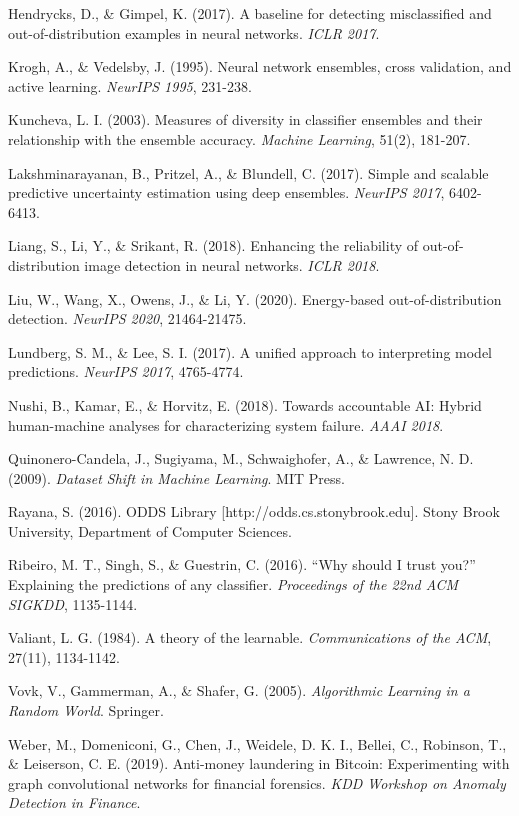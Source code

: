 \documentclass[
  11pt,
]{article}
\newcounter{none} %
\begin{document}
Hendrycks, D., \& Gimpel, K. (2017). A baseline for detecting
misclassified and out-of-distribution examples in neural networks.
\emph{ICLR 2017}.

Krogh, A., \& Vedelsby, J. (1995). Neural network ensembles, cross
validation, and active learning. \emph{NeurIPS 1995}, 231-238.

Kuncheva, L. I. (2003). Measures of diversity in classifier ensembles
and their relationship with the ensemble accuracy. \emph{Machine
Learning}, 51(2), 181-207.

Lakshminarayanan, B., Pritzel, A., \& Blundell, C. (2017). Simple and
scalable predictive uncertainty estimation using deep ensembles.
\emph{NeurIPS 2017}, 6402-6413.

Liang, S., Li, Y., \& Srikant, R. (2018). Enhancing the reliability of
out-of-distribution image detection in neural networks. \emph{ICLR
2018}.

Liu, W., Wang, X., Owens, J., \& Li, Y. (2020). Energy-based
out-of-distribution detection. \emph{NeurIPS 2020}, 21464-21475.

Lundberg, S. M., \& Lee, S. I. (2017). A unified approach to
interpreting model predictions. \emph{NeurIPS 2017}, 4765-4774.

Nushi, B., Kamar, E., \& Horvitz, E. (2018). Towards accountable AI:
Hybrid human-machine analyses for characterizing system failure.
\emph{AAAI 2018}.

Quinonero-Candela, J., Sugiyama, M., Schwaighofer, A., \& Lawrence, N.
D. (2009). \emph{Dataset Shift in Machine Learning}. MIT Press.

Rayana, S. (2016). ODDS Library {[}http://odds.cs.stonybrook.edu{]}.
Stony Brook University, Department of Computer Sciences.

Ribeiro, M. T., Singh, S., \& Guestrin, C. (2016). “Why should I trust
you?” Explaining the predictions of any classifier. \emph{Proceedings of
the 22nd ACM SIGKDD}, 1135-1144.

Valiant, L. G. (1984). A theory of the learnable. \emph{Communications
of the ACM}, 27(11), 1134-1142.

Vovk, V., Gammerman, A., \& Shafer, G. (2005). \emph{Algorithmic
Learning in a Random World}. Springer.

Weber, M., Domeniconi, G., Chen, J., Weidele, D. K. I., Bellei, C.,
Robinson, T., \& Leiserson, C. E. (2019). Anti-money laundering in
Bitcoin: Experimenting with graph convolutional networks for financial
forensics. \emph{KDD Workshop on Anomaly Detection in Finance}.
\end{document}
